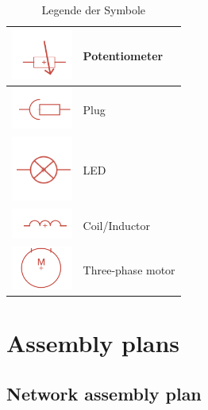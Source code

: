 \begin{table}[ht]
{\begin{tabular}{|m{5cm}|m{7cm}|}
			\hline
			\centering\includegraphics[width=2cm]{Legende/Potentiometer.png} & \centering Potentiometer \tabularnewline
			\hline
			\centering\includegraphics[width=2cm]{Legende/Stecker.png} & \centering Plug \tabularnewline
			\hline
			\centering\includegraphics[width=2cm]{Legende/LED.png} & \centering LED \tabularnewline
			\hline
			\centering\includegraphics[width=2cm]{Legende/Spule.png} & \centering Coil/Inductor \tabularnewline
			\hline
			\centering\includegraphics[width=2cm]{Legende/3 Phasen Motor.png} & \centering Three-phase motor \tabularnewline
			\hline
	\end{tabular}}
	\caption{Legende der Symbole}
	\label{tab:legende}
\end{table}

\section{Assembly plans}

\subsection{Network assembly plan}

